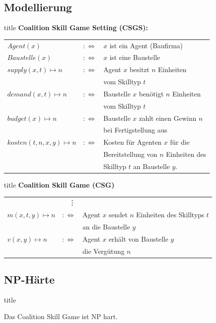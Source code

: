 \documentclass[c]{beamer}
\theoremstyle{break}
\begin{document}
  \subsection*{Modellierung}
  \begin{frame}{title} %
    \textbf{Coalition Skill Game Setting (CSGS):}
    \begin{tabular}{lrl}
    $Agent(x)$&$:\Leftrightarrow$& $x$ ist ein Agent (Baufirma) \\
    $Baustelle(x) $&$:\Leftrightarrow$& $x$ ist eine Baustelle \\
    $supply(x, t)\mapsto n $&$:\Leftrightarrow$& Agent $x$ besitzt $n$ Einheiten \\&& vom Skilltyp $t$ \\
    $demand(x, t)\mapsto n $&$:\Leftrightarrow$& Baustelle $x$ benötigt $n$ Einheiten \\&& vom Skilltyp $t$ \\
    $budget(x)\mapsto n $&$:\Leftrightarrow$&
    Baustelle $x$ zahlt einen Gewinn $n$ \\&& bei Fertigstellung aus\\
    $kosten(t, n, x, y)\mapsto n$&$:\Leftrightarrow$& Kosten für Agenten $x$ für die \\&& Bereitstellung von $n$ Einheiten des \\&& Skilltyp $t$ an Baustelle $y$.
    \end{tabular}
  \end{frame}

  \begin{frame}{title}
    \textbf{Coalition Skill Game (CSG)}
    \begin{tabular}{lrl}
      &\vdots\\
    $m(x, t, y)\mapsto n$&$:\Leftrightarrow$& Agent $x$ sendet $n$ Einheiten des Skilltyps $t$ \\&& an die Baustelle $y$ \\
    $v(x,y)\mapsto n$&$:\Leftrightarrow$& Agent $x$ erhält von Baustelle $y$ \\&& die Vergütung $n$
    \end{tabular}
  \end{frame}

  \subsection*{NP-Härte}
  \begin{frame}{title} %
    \begin{lemma}
      Das Coalition Skill Game ist NP hart.
    \end{lemma}
  \end{frame}
\end{document}
